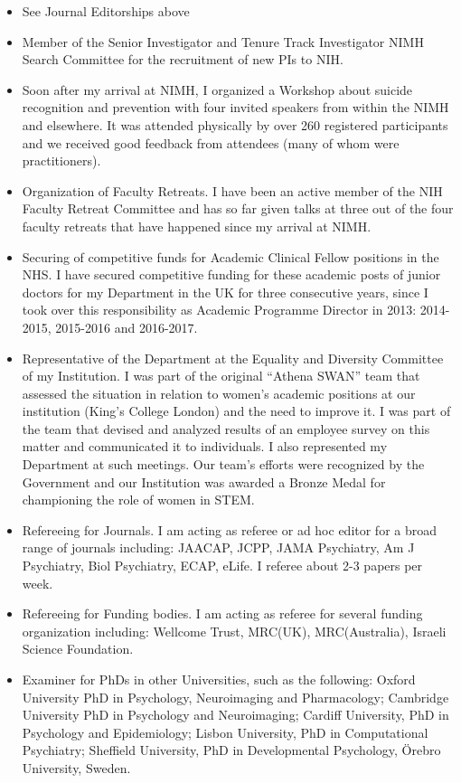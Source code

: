 \documentclass[
]{article}
\begin{document}
\begin{itemize}
\item
  See Journal Editorships above
\item
  Member of the Senior Investigator and Tenure Track Investigator NIMH
  Search Committee for the recruitment of new PIs to NIH.
\item
  Soon after my arrival at NIMH, I organized a Workshop about suicide
  recognition and prevention with four invited speakers from within the
  NIMH and elsewhere. It was attended physically by over 260 registered
  participants and we received good feedback from attendees (many of
  whom were practitioners).
\item
  Organization of Faculty Retreats. I have been an active member of the
  NIH Faculty Retreat Committee and has so far given talks at three out
  of the four faculty retreats that have happened since my arrival at
  NIMH.
\item
  Securing of competitive funds for Academic Clinical Fellow positions
  in the NHS. I have secured competitive funding for these academic
  posts of junior doctors for my Department in the UK for three
  consecutive years, since I took over this responsibility as Academic
  Programme Director in 2013: 2014-2015, 2015-2016 and 2016-2017.
\item
  Representative of the Department at the Equality and Diversity
  Committee of my Institution. I was part of the original ``Athena
  SWAN'' team that assessed the situation in relation to women's
  academic positions at our institution (King's College London) and the
  need to improve it. I was part of the team that devised and analyzed
  results of an employee survey on this matter and communicated it to
  individuals. I also represented my Department at such meetings. Our
  team's efforts were recognized by the Government and our Institution
  was awarded a Bronze Medal for championing the role of women in STEM.
\item
  Refereeing for Journals. I am acting as referee or ad hoc editor for a
  broad range of journals including: JAACAP, JCPP, JAMA Psychiatry, Am J
  Psychiatry, Biol Psychiatry, ECAP, eLife. I referee about 2-3 papers
  per week.
\item
  Refereeing for Funding bodies. I am acting as referee for several
  funding organization including: Wellcome Trust, MRC(UK),
  MRC(Australia), Israeli Science Foundation.
\item
  Examiner for PhDs in other Universities, such as the following: Oxford
  University PhD in Psychology, Neuroimaging and Pharmacology; Cambridge
  University PhD in Psychology and Neuroimaging; Cardiff University, PhD
  in Psychology and Epidemiology; Lisbon University, PhD in
  Computational Psychiatry; Sheffield University, PhD in Developmental
  Psychology, Örebro University, Sweden.
\end{itemize}
\end{document}
